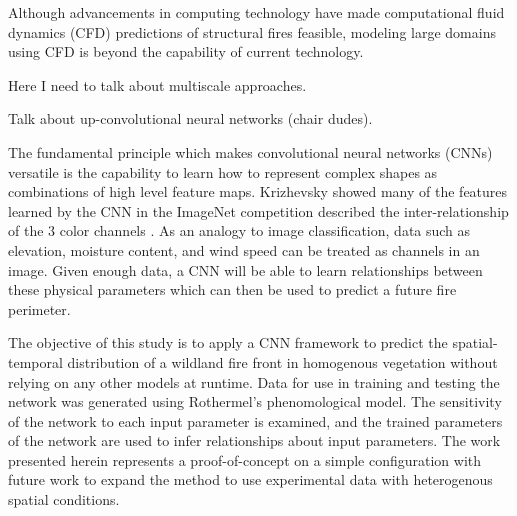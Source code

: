 \documentclass[smallcondensed]{svjour3}     %
\begin{document}
Although advancements in computing technology
have made computational fluid dynamics (CFD) predictions of structural fires
feasible, modeling large domains using CFD is beyond the capability of
current technology.

Here I need to talk about multiscale approaches.

Talk about up-convolutional neural networks (chair dudes).







The fundamental principle which makes convolutional neural networks (CNNs)
versatile is the capability to learn how to represent complex
shapes as combinations of high level feature maps. Krizhevsky showed
many of the features learned by the CNN in the ImageNet competition
described the inter-relationship of the 3 color channels \cite{krizhevsky2012imagenet}.
As an analogy to image classification, data such as elevation, moisture content, and 
wind speed can be treated as channels in an image. Given enough data, a CNN will be
able to learn relationships between these physical parameters which can then be used
to predict a future fire perimeter.

The objective of this study is to apply a CNN framework to predict the
spatial-temporal distribution of a wildland fire front in homogenous vegetation
without relying on any other models at runtime. Data for use in
training and testing the network was generated using Rothermel's phenomological
model. The sensitivity of the network to each input parameter is examined,
and the trained parameters of the network are used to infer relationships
about input parameters. The work presented herein represents a proof-of-concept
on a simple configuration with future work to expand the method to use
experimental data with heterogenous spatial conditions.
\end{document}
